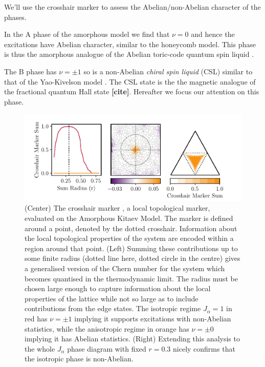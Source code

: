 We'll use the crosshair marker to assess the Abelian/non-Abelian character of the phases.

In the A phase of the amorphous model we find that \(\nu=0\) and hence the excitations have Abelian character, similar to the honeycomb model. This phase is thus the amorphous analogue of the Abelian toric-code quantum spin liquid \autocite{kitaev_fault-tolerant_2003}.

The B phase has \(\nu=\pm1\) so is a non-Abelian \emph{chiral spin liquid} (CSL) similar to that of the Yao-Kivelson model \autocite{yaoExactChiralSpin2007}. The CSL state is the the magnetic analogue of the fractional quantum Hall state \textbf{{[}cite{]}}. Hereafter we focus our attention on this phase.

\begin{figure}
\hypertarget{fig:phase_diagram_chern}{%
\centering
\includegraphics[width=1\textwidth,height=\textheight]{figure_code/amk_chapter/results/phase_diagram_chern/phase_diagram_chern.pdf}
\caption{(Center) The crosshair marker \textcite{peru_preprint}, a local topological marker, evaluated on the Amorphous Kitaev Model. The marker is defined around a point, denoted by the dotted crosshair. Information about the local topological properties of the system are encoded within a region around that point. (Left) Summing these contributions up to some finite radius (dotted line here, dotted circle in the centre) gives a generalised version of the Chern number for the system which becomes quantised in the thermodynamic limit. The radius must be chosen large enough to capture information about the local properties of the lattice while not so large as to include contributions from the edge states. The isotropic regime \(J_\alpha = 1\) in red has \(\nu = \pm 1\) implying it supports excitations with non-Abelian statistics, while the anisotropic regime in orange has \(\nu = \pm 0\) implying it has Abelian statistics. (Right) Extending this analysis to the whole \(J_\alpha\) phase diagram with fixed \(r = 0.3\) nicely confirms that the isotropic phase is non-Abelian.}\label{fig:phase_diagram_chern}
}
\end{figure}

